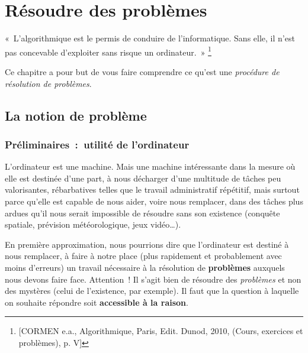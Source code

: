 \chapter{Résoudre des problèmes}

	\begin{Exergue}
		«~L’algorithmique est le permis de conduire de l’informatique.
		Sans elle, il n’est pas concevable d’exploiter sans risque un ordinateur.~»
		\footnote{[CORMEN e.a., Algorithmique, Paris, Edit. Dunod, 2010, (Cours, 
		exercices et problèmes), p. V] }
	\end{Exergue}

	Ce chapitre a pour but
	de vous faire comprendre ce qu’est une 
	\emph{procédure de résolution de problèmes}.

	\section{La notion de problème}
	
		\subsection{Préliminaires~:~utilité de l’ordinateur}
		
			L’ordinateur est une machine. 
			Mais une machine intéressante dans la mesure 
			où elle est destinée d’une part, 
			à nous décharger d’une multitude de tâches peu valorisantes, 
			rébarbatives telles que le travail administratif répétitif, 
			mais surtout parce qu’elle est capable de nous aider, 
			voire nous remplacer, dans des tâches plus ardues 
			qu’il nous serait impossible de résoudre sans son existence 
			(conquête spatiale, prévision météorologique, jeux vidéo\dots).
			
			En première approximation, 
			nous pourrions dire que l’ordinateur 
			est destiné à nous remplacer, 
			à faire à notre place 
			(plus rapidement et probablement avec moins d’erreurs) 
			un travail nécessaire à la résolution de \textbf{problèmes} 
			auxquels nous devons faire face. 
			Attention~! Il s’agit bien de résoudre des \textit{problèmes} 
			et non des mystères (celui de l’existence, par exemple). 
			Il faut que la question à laquelle
			on souhaite répondre soit \textbf{accessible à la raison}.
	
